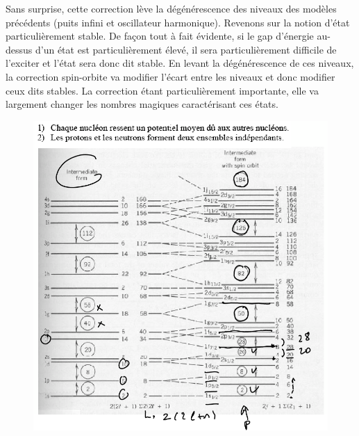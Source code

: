 Sans surprise, cette correction lève la dégénérescence des niveaux des modèles précédents (puits infini et oscillateur harmonique). Revenons sur la notion d'état particulièrement stable. De façon tout à fait évidente, si le gap d'énergie au-dessus d'un état est particulièrement élevé, il sera particulièrement difficile de l'exciter et l'état sera donc dit stable. En levant la dégénérescence de ces niveaux, la correction spin-orbite va modifier l'écart entre les niveaux et donc modifier ceux dits stables. La correction étant particulièrement importante, elle va largement changer les nombres magiques caractérisant ces états.
\begin{figure}[H]
    \centering
    \includegraphics[width=\textwidth]{Images4/spin-orbite.PNG}
\end{figure}
